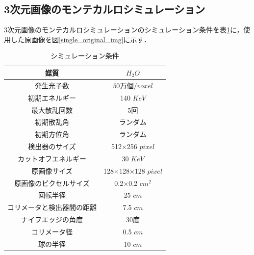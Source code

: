 \documentclass[dvipdfmx,autodetect-engine,twocolumn,10pt]{jsarticle}%
\newif\iffigure
\begin{document}
\subsection{3次元画像のモンテカルロシミュレーション}
3次元画像のモンテカルロシミュレーションのシミュレーション条件を表\ref{3d_single}に，使用した原画像を図\ref{single_original_img}に示す．
\begin{table}[htbp]
  \begin{center}
    \caption{シミュレーション条件}
    \label{3d_single}
    \begin{tabular}{|c|c|} \hline
      \footnotesize{媒質} & \footnotesize{$H_2O$} \\ \hline
      \footnotesize{発生光子数} & \footnotesize{$50万個/voxel$} \\ \hline
      \footnotesize{初期エネルギー} & \footnotesize{140 $KeV$} \\ \hline
      \footnotesize{最大散乱回数} & \footnotesize{5回} \\ \hline
      \footnotesize{初期散乱角} & \footnotesize{ランダム} \\ \hline
      \footnotesize{初期方位角} & \footnotesize{ランダム} \\ \hline
      \footnotesize{検出器のサイズ} & \footnotesize{512×256 $pixel$} \\ \hline
      \footnotesize{カットオフエネルギー} & \footnotesize{30 $KeV$} \\ \hline
      \footnotesize{原画像サイズ} & \footnotesize{128×128×128 $pixel$} \\ \hline
      \footnotesize{原画像のピクセルサイズ} & \footnotesize{0.2×0.2 $cm^2$} \\ \hline
      \footnotesize{回転半径} & \footnotesize{25 $cm$} \\ \hline
      \footnotesize{コリメータと検出器間の距離} & \footnotesize{7.5 $cm$} \\ \hline
      \footnotesize{ナイフエッジの角度} & \footnotesize{30度} \\ \hline
      \footnotesize{コリメータ径} & \footnotesize{0.5 $cm$} \\ \hline
      \footnotesize{球の半径} & \footnotesize{10 $cm$} \\ \hline
    \end{tabular}
  \end{center}
\end{table}

\iffigure
  \begin{figure}[htbp]
    \begin{center}
      \texttt{[image: ./file/single\_original.png]}
      \caption{原画像（128×128×128）}
      \label{single_original_img}
    \end{center}
  \end{figure}
\fi
\end{document}
